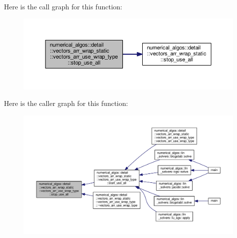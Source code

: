 Here is the call graph for this function\-:\nopagebreak
\begin{figure}[H]
\begin{center}
\leavevmode
\includegraphics[width=350pt]{structnumerical__algos_1_1detail_1_1vectors__arr__wrap__static_1_1vectors__arr__use__wrap__type_adf139335704400b0a9ff32aa473ba64f_cgraph}
\end{center}
\end{figure}




Here is the caller graph for this function\-:\nopagebreak
\begin{figure}[H]
\begin{center}
\leavevmode
\includegraphics[width=350pt]{structnumerical__algos_1_1detail_1_1vectors__arr__wrap__static_1_1vectors__arr__use__wrap__type_adf139335704400b0a9ff32aa473ba64f_icgraph}
\end{center}
\end{figure}




